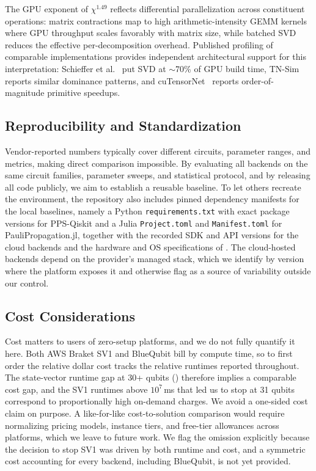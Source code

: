 \documentclass[conference,10pt]{IEEEtran}
\begin{document}
The GPU exponent of $\chi^{1.49}$ reflects differential parallelization across constituent operations: matrix contractions map to high arithmetic-intensity GEMM kernels where GPU throughput scales favorably with matrix size, while batched SVD reduces the effective per-decomposition overhead. Published profiling of comparable implementations provides independent architectural support for this interpretation: Schieffer et al.~\cite{schieffer2025harnessingcudaqsmpstensor} put SVD at $\sim$70\% of GPU build time, TN-Sim~\cite{hoyt2026tnsim} reports similar dominance patterns, and cuTensorNet~\cite{bayraktar2023cuquantum} reports order-of-magnitude primitive speedups.

\subsection{Reproducibility and Standardization}
 
Vendor-reported numbers typically cover different circuits, parameter ranges, and metrics, making direct comparison impossible. By evaluating all backends on the same circuit families, parameter sweeps, and statistical protocol, and by releasing all code publicly, we aim to establish a reusable baseline. To let others recreate the environment, the repository also includes pinned dependency manifests for the local baselines, namely a Python \texttt{requirements.txt} with exact package versions for PPS-Qiskit and a Julia \texttt{Project.toml} and \texttt{Manifest.toml} for PauliPropagation.jl, together with the recorded SDK and API versions for the cloud backends and the hardware and OS specifications of . The cloud-hosted backends depend on the provider's managed stack, which we identify by version where the platform exposes it and otherwise flag as a source of variability outside our control.

\subsection{Cost Considerations}

Cost matters to users of zero-setup platforms, and we do not fully quantify it here. Both AWS Braket SV1 and BlueQubit bill by compute time, so to first order the relative dollar cost tracks the relative runtimes reported throughout. The state-vector runtime gap at 30+ qubits () therefore implies a comparable cost gap, and the SV1 runtimes above $10^{7}$\,ms that led us to stop at 31 qubits correspond to proportionally high on-demand charges. We avoid a one-sided cost claim on purpose. A like-for-like cost-to-solution comparison would require normalizing pricing models, instance tiers, and free-tier allowances across platforms, which we leave to future work. We flag the omission explicitly because the decision to stop SV1 was driven by both runtime and cost, and a symmetric cost accounting for every backend, including BlueQubit, is not yet provided.
\end{document}

